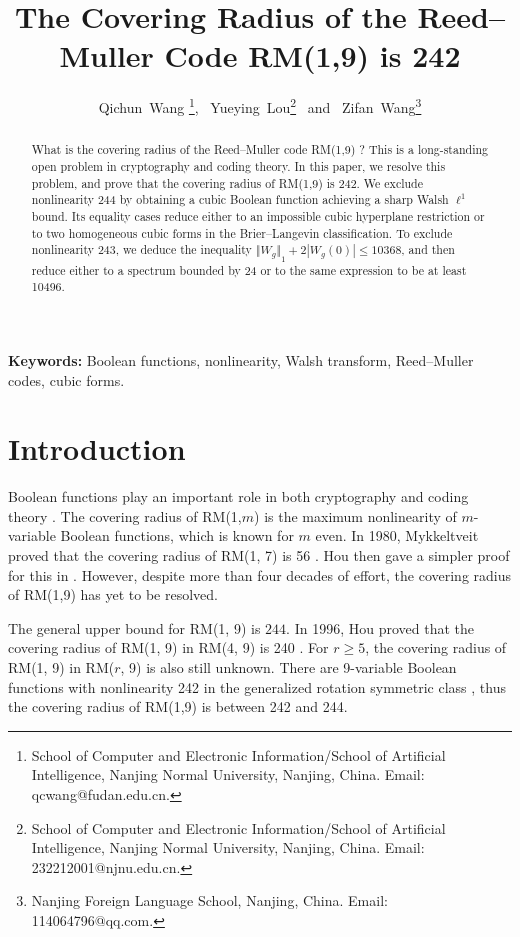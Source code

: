 \documentclass[11pt]{article}
\date{}
\newtheorem{open problem}{Open problem}
\begin{document}
\title{The Covering Radius of the Reed--Muller Code RM(1,9)  is 242}
\author{Qichun~Wang \footnote{School of Computer and Electronic Information/School of Artificial Intelligence,
Nanjing Normal University, Nanjing, China. Email: qcwang@fudan.edu.cn.}, \ Yueying~Lou\footnote{School of Computer and Electronic Information/School of Artificial Intelligence,
Nanjing Normal University, Nanjing, China. Email: 232212001@njnu.edu.cn.
} \ and \ Zifan~Wang\footnote{Nanjing Foreign Language School, Nanjing, China. Email: 114064796@qq.com.}}
\maketitle


\begin{abstract}
 What is the covering radius of the Reed--Muller code  RM(1,9) ? This is a long-standing open problem in
cryptography and coding theory.  In this paper, we resolve this problem, and prove that the covering radius of RM(1,9) is 242.  We
exclude nonlinearity 244 by obtaining a cubic Boolean function achieving a sharp Walsh $\ell^1$ bound. Its equality cases reduce either to an impossible cubic hyperplane restriction or to two homogeneous cubic forms in the Brier--Langevin classification. To exclude nonlinearity 243, we deduce the inequality ${\Vert W_g\Vert }_{1}+2|W_g(0)|\le 10368$, and then reduce either to a spectrum bounded by 24 or to the same expression to be at least 10496.
\end{abstract}


\par {\bf Keywords:}  Boolean functions, nonlinearity, Walsh transform, Reed--Muller codes, cubic forms.




\section{Introduction}
Boolean functions play an important role in both cryptography and coding theory \cite{Car,Logachev}. The covering radius of RM(1,$m$) is the maximum nonlinearity of $m$-variable Boolean functions, which is known for $m$ even. In 1980, Mykkeltveit proved that the covering radius of RM(1, 7) is 56 \cite{Mykkeltvei}. Hou then gave a simpler proof for this in \cite{Hou}. However, despite more than four decades of effort, the covering radius of RM(1,9)  has yet to be resolved.

The general upper bound for RM(1, 9) is $244$. In 1996, Hou proved that the covering radius of RM(1, 9) in RM(4, 9) is 240 \cite{Hou2}. For $r\ge 5$, the covering radius of RM(1, 9) in RM($r$, 9) is also still unknown. There are 9-variable  Boolean functions with nonlinearity 242 in the generalized rotation symmetric class \cite{Kavut,Kavut2}, thus the covering radius of RM(1,9) is between 242 and 244.
\end{document}
